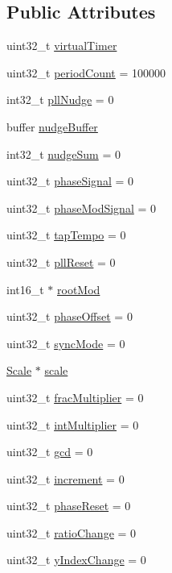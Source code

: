 \subsection*{Public Attributes}
\begin{DoxyCompactItemize}
\item 
uint32\+\_\+t \mbox{\hyperlink{class_pll_controller_a89e3f6e5735bac7bd9f439d64fa471a1}{virtual\+Timer}}
\item 
uint32\+\_\+t \mbox{\hyperlink{class_pll_controller_a19c29fa6611683104d32bb1a56d26af8}{period\+Count}} = 100000
\item 
int32\+\_\+t \mbox{\hyperlink{class_pll_controller_a4aba38d40403a993d169263914b5f194}{pll\+Nudge}} = 0
\item 
buffer \mbox{\hyperlink{class_pll_controller_a7bb6f89468b488a794d8292e15ef723f}{nudge\+Buffer}}
\item 
int32\+\_\+t \mbox{\hyperlink{class_pll_controller_a723cfa6fe1dd1fdc35f6b99013504f97}{nudge\+Sum}} = 0
\item 
uint32\+\_\+t \mbox{\hyperlink{class_pll_controller_a5490fe11d97e3f897852274653051c40}{phase\+Signal}} = 0
\item 
uint32\+\_\+t \mbox{\hyperlink{class_pll_controller_a84a63d8a34640cdf12e5a44924de266a}{phase\+Mod\+Signal}} = 0
\item 
uint32\+\_\+t \mbox{\hyperlink{class_pll_controller_a5b7d79e70308866985115d8ed8d8f6b7}{tap\+Tempo}} = 0
\item 
uint32\+\_\+t \mbox{\hyperlink{class_pll_controller_a41a6b4e168a627a997b5a3c4164e2d52}{pll\+Reset}} = 0
\item 
int16\+\_\+t $\ast$ \mbox{\hyperlink{class_pll_controller_a72329e852b57703a2e05d5ba55e4b981}{root\+Mod}}
\item 
uint32\+\_\+t \mbox{\hyperlink{class_pll_controller_af80fb05d453d39c1a5d50179630b8dde}{phase\+Offset}} = 0
\item 
uint32\+\_\+t \mbox{\hyperlink{class_pll_controller_a70195365dbe2fdef1da3f5be902a1659}{sync\+Mode}} = 0
\item 
\mbox{\hyperlink{struct_scale}{Scale}} $\ast$ \mbox{\hyperlink{class_pll_controller_aef2d38132313513f4b067205798732b5}{scale}}
\item 
uint32\+\_\+t \mbox{\hyperlink{class_pll_controller_a46d1d737b75b6fea470da4478601e5d5}{frac\+Multiplier}} = 0
\item 
uint32\+\_\+t \mbox{\hyperlink{class_pll_controller_abc6035e4ef80199f8e9d785d8b1ea863}{int\+Multiplier}} = 0
\item 
uint32\+\_\+t \mbox{\hyperlink{class_pll_controller_a0c6c2cda1c770da1223d5b1026154dec}{gcd}} = 0
\item 
uint32\+\_\+t \mbox{\hyperlink{class_pll_controller_aefcdb1b8661987bb8077eb1ce8f79f8f}{increment}} = 0
\item 
uint32\+\_\+t \mbox{\hyperlink{class_pll_controller_a888834a5eadb85c8da7261b2a8757f94}{phase\+Reset}} = 0
\item 
uint32\+\_\+t \mbox{\hyperlink{class_pll_controller_a9d13d4b70da3524ce341fe2809555a5e}{ratio\+Change}} = 0
\item 
uint32\+\_\+t \mbox{\hyperlink{class_pll_controller_ad89f1e970fa2b2cc2da56fc83a189be7}{y\+Index\+Change}} = 0
\end{DoxyCompactItemize}
